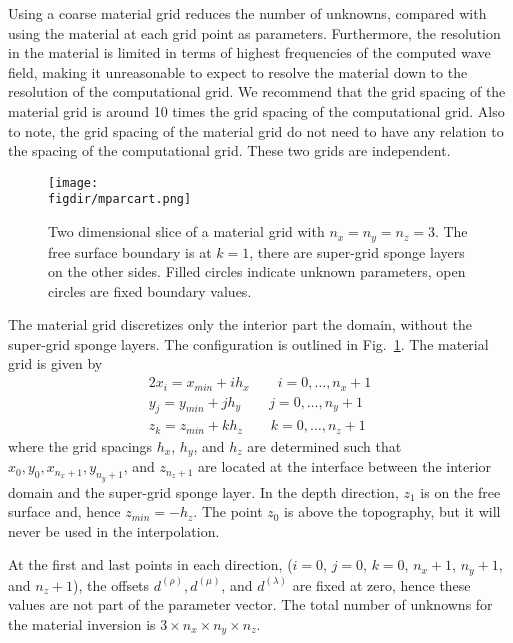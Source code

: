 \documentclass[12pt]{report}
\def\figdir{mfigs}
\begin{document}
\par
Using a coarse material grid reduces the number of unknowns, compared with using the 
material at each grid point as parameters. Furthermore, the resolution in the material
is limited in terms of highest frequencies of the computed wave field, making it unreasonable
to expect to resolve the material down to the resolution of the computational grid.
We recommend that the grid spacing of the material grid is around 10 times 
the grid spacing of the computational grid. Also to note, the grid spacing of the material 
grid do not need to have any relation to the spacing of the computational grid. 
These two grids are independent.
\par
\begin{figure}
\begin{center}
\texttt{[image: \\figdir/mparcart.png]}
\caption{Two dimensional slice of a material grid with $n_x=n_y=n_z=3$. The free surface boundary
is at $k=1$, there are super-grid sponge layers on the other sides. Filled circles indicate unknown
parameters, open circles are fixed boundary values.}
\label{fig:mparcart}
\end{center}
\end{figure}
\par
The material grid discretizes only the interior part the domain, without the super-grid
sponge layers. The configuration is outlined in Fig.~\ref{fig:mparcart}.
The material grid is given by
\begin{alignat}{2}
 x_i = x_{min}+ i h_x \qquad i=0,\ldots,n_x+1\\
 y_j = y_{min}+ j h_y \qquad j=0,\ldots,n_y+1\\
 z_k = z_{min}+ k h_z \qquad k=0,\ldots,n_z+1
\end{alignat}
where the grid spacings $h_x$, $h_y$, and $h_z$ are determined such that $x_0, y_0, x_{n_x+1}, y_{n_y+1}$,
and $z_{n_z+1}$ are located at the interface between the interior domain and the super-grid sponge layer. 
In the depth direction, $z_1$ is on the free surface and, hence $z_{min}=-h_z$. The point $z_0$ is above the 
topography, but it will never be used in the interpolation. 

At the first and last points in each direction, ($i=0$, $j=0$, $k=0$, $n_x+1$, $n_y+1$, and $n_z+1$),
the offsets $d^{(\rho)}, d^{(\mu)}$, and $d^{(\lambda)}$ are fixed at zero, hence these values are
not part of the parameter vector. The total number of unknowns for the material inversion
is $3 \times n_x \times n_y \times n_z$.
\end{document}
